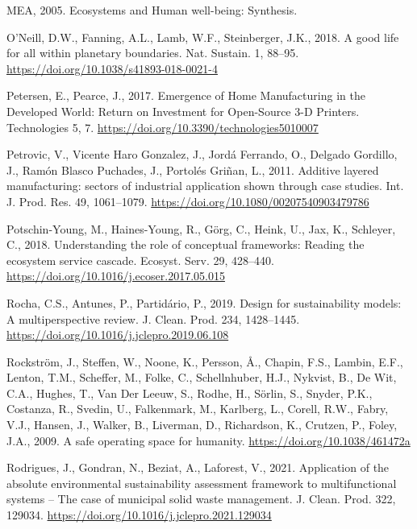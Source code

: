 \documentclass[]{elsarticle} %
\newlength{\cslhangindent}
\newenvironment{CSLReferences}[2] %
 {%
  \setlength{\parindent}{0pt}
  \ifodd #1 \everypar{\setlength{\hangindent}{\cslhangindent}}\ignorespaces\fi
  \ifnum #2 > 0
  \setlength{\parskip}{#2\baselineskip}
  \fi
 }%
 {}
\begin{document}
\begin{CSLReferences}{1}{0}
\leavevmode{}%
MEA, 2005. {Ecosystems and Human well-being: Synthesis}.

\leavevmode{}%
O'Neill, D.W., Fanning, A.L., Lamb, W.F., Steinberger, J.K., 2018. {A good life for all within planetary boundaries}. Nat. Sustain. 1, 88--95. \url{https://doi.org/10.1038/s41893-018-0021-4}

\leavevmode{}%
Petersen, E., Pearce, J., 2017. {Emergence of Home Manufacturing in the Developed World: Return on Investment for Open-Source 3-D Printers}. Technologies 5, 7. \url{https://doi.org/10.3390/technologies5010007}

\leavevmode{}%
Petrovic, V., Vicente Haro Gonzalez, J., Jordá Ferrando, O., Delgado Gordillo, J., Ramón Blasco Puchades, J., Portolés Griñan, L., 2011. {Additive layered manufacturing: sectors of industrial application shown through case studies}. Int. J. Prod. Res. 49, 1061--1079. \url{https://doi.org/10.1080/00207540903479786}

\leavevmode{}%
Potschin-Young, M., Haines-Young, R., Görg, C., Heink, U., Jax, K., Schleyer, C., 2018. {Understanding the role of conceptual frameworks: Reading the ecosystem service cascade}. Ecosyst. Serv. 29, 428--440. \url{https://doi.org/10.1016/j.ecoser.2017.05.015}

\leavevmode{}%
Rocha, C.S., Antunes, P., Partidário, P., 2019. {Design for sustainability models: A multiperspective review}. J. Clean. Prod. 234, 1428--1445. \url{https://doi.org/10.1016/j.jclepro.2019.06.108}

\leavevmode{}%
Rockström, J., Steffen, W., Noone, K., Persson, Å., Chapin, F.S., Lambin, E.F., Lenton, T.M., Scheffer, M., Folke, C., Schellnhuber, H.J., Nykvist, B., De Wit, C.A., Hughes, T., Van Der Leeuw, S., Rodhe, H., Sörlin, S., Snyder, P.K., Costanza, R., Svedin, U., Falkenmark, M., Karlberg, L., Corell, R.W., Fabry, V.J., Hansen, J., Walker, B., Liverman, D., Richardson, K., Crutzen, P., Foley, J.A., 2009. {A safe operating space for humanity}. \url{https://doi.org/10.1038/461472a}

\leavevmode{}%
Rodrigues, J., Gondran, N., Beziat, A., Laforest, V., 2021. {Application of the absolute environmental sustainability assessment framework to multifunctional systems -- The case of municipal solid waste management}. J. Clean. Prod. 322, 129034. \url{https://doi.org/10.1016/j.jclepro.2021.129034}


\end{CSLReferences}
\end{document}
